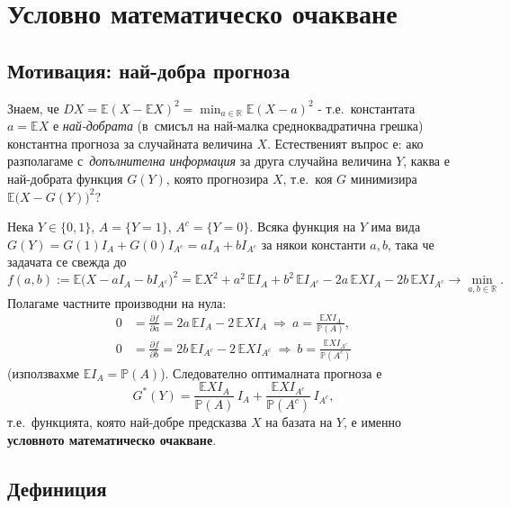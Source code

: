 \chapter{Условно математическо очакване}

\section{Мотивация: най-добра прогноза}

\begin{rembox}
Знаем, че $DX = \mathbb E(X-\mathbb EX)^2 = \min_{a\in\mathbb R}
\mathbb E(X-a)^2$ - т.е.\ константата $a=\mathbb EX$ е
\emph{най-добрата} (в~смисъл на най-малка средноквадратична грешка)
константна прогноза за случайната величина $X$. Естественият
въпрос е: ако разполагаме с~\emph{допълнителна информация} за друга
случайна величина $Y$, каква е най-добрата функция $G(Y)$, която
прогнозира $X$, т.е.\ коя $G$ минимизира $\mathbb E\big(X-G(Y)\big)^2$?
\end{rembox}

\begin{rembox}
Нека $Y\in\{0,1\}$, $A=\{Y{=}1\}$, $A^c=\{Y{=}0\}$. Всяка функция на
$Y$ има вида $G(Y)=G(1)I_A+G(0)I_{A^c}=aI_A+
bI_{A^c}$ за някои константи $a,b$, така че задачата се
свежда до
\[
  f(a,b) := \mathbb E\big(X-aI_A-bI_{A^c}\big)^2 = \mathbb EX^2 + a^2\,\mathbb EI_A + b^2\,\mathbb EI_{A^c} - 2a\,\mathbb EXI_A - 2b\,\mathbb EXI_{A^c} \to \min_{a,b\in\mathbb R}.
\]
Полагаме частните производни на нула:
\begin{align*}
  0 &= \frac{\partial f}{\partial a} = 2a\,\mathbb EI_A - 2\,\mathbb EXI_A \ \Rightarrow\ a = \frac{\mathbb EXI_A}{\mathbb P(A)},\\
  0 &= \frac{\partial f}{\partial b} = 2b\,\mathbb EI_{A^c} - 2\,\mathbb EXI_{A^c} \ \Rightarrow\ b = \frac{\mathbb EXI_{A^c}}{\mathbb P(A^c)}
\end{align*}
(използвахме $\mathbb EI_A=\mathbb P(A)$). Следователно
оптималната прогноза е
\[
  G^*(Y) = \frac{\mathbb EXI_A}{\mathbb P(A)}\,I_A + \frac{\mathbb EXI_{A^c}}{\mathbb P(A^c)}\,I_{A^c},
\]
т.е.\ функцията, която най-добре предсказва $X$ на базата на $Y$, е
именно \textbf{условното математическо очакване}.
\end{rembox}

\section{Дефиниция}

